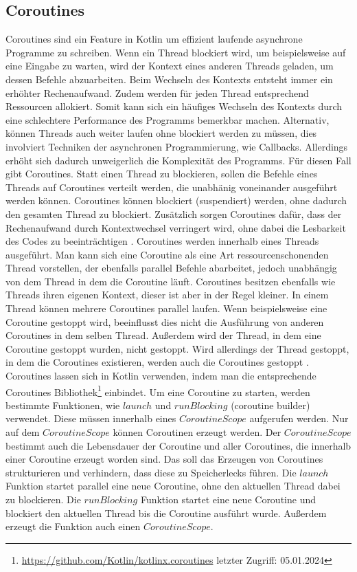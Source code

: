 \documentclass{article}
\begin{document}
\subsection{Coroutines}
Coroutines sind ein Feature in Kotlin um effizient laufende asynchrone Programme zu schreiben. Wenn ein Thread blockiert wird, um beispielsweise auf eine Eingabe zu warten, wird der Kontext eines anderen Threads geladen, um dessen Befehle abzuarbeiten. Beim Wechseln des Kontexts entsteht immer ein erhöhter Rechenaufwand. Zudem werden für jeden Thread entsprechend Ressourcen allokiert. Somit kann sich ein häufiges Wechseln des Kontexts durch eine schlechtere Performance des Programms bemerkbar machen. Alternativ, können Threads auch weiter laufen ohne blockiert werden zu müssen, dies involviert Techniken der asynchronen Programmierung, wie Callbacks. Allerdings erhöht sich dadurch unweigerlich die Komplexität des Programms. Für diesen Fall gibt Coroutines. Statt einen Thread zu blockieren, sollen die Befehle eines Threads auf Coroutines verteilt werden, die unabhänig voneinander ausgeführt werden können. Coroutines können blockiert (suspendiert) werden, ohne dadurch den gesamten Thread zu blockiert. Zusätzlich sorgen Coroutines dafür, dass der Rechenaufwand durch Kontextwechsel verringert wird, ohne dabei die Lesbarkeit des Codes zu beeinträchtigen \cite{Kotlin_In-D}. \newline
Coroutines werden innerhalb eines Threads ausgeführt. Man kann sich eine Coroutine als eine Art ressourcenschonenden Thread vorstellen, der ebenfalls parallel Befehle abarbeitet, jedoch unabhängig von dem Thread in dem die Coroutine läuft. Coroutines besitzen ebenfalls wie Threads ihren eigenen Kontext, dieser ist aber in der Regel kleiner. In einem Thread können mehrere Coroutines parallel laufen. Wenn beispielsweise eine Coroutine gestoppt wird, beeinflusst dies nicht die Ausführung von anderen Coroutines in dem selben Thread. Außerdem  wird der Thread, in dem eine Coroutine gestoppt wurden, nicht gestoppt. Wird allerdings der Thread gestoppt, in dem die Coroutines existieren, werden auch die Coroutines gestoppt \cite{KotlinLangDocCoroutines}. \newline
Coroutines lassen sich in Kotlin verwenden, indem man die entsprechende Coroutines Bibliothek\footnote{\url{https://github.com/Kotlin/kotlinx.coroutines} letzter Zugriff: 05.01.2024} einbindet.  Um eine Coroutine zu starten, werden bestimmte Funktionen, wie $launch$ und $runBlocking$ (coroutine builder) verwendet. Diese müssen innerhalb eines $CoroutineScope$ aufgerufen werden. Nur auf dem $CoroutineScope$ können Coroutinen erzeugt werden. Der $CoroutineScope$ bestimmt auch die Lebensdauer der Coroutine und aller Coroutines, die innerhalb einer Coroutine erzeugt worden sind.  Das soll das Erzeugen von Coroutines strukturieren und verhindern, dass diese zu Speicherlecks führen.  Die $launch$ Funktion startet parallel eine neue Coroutine, ohne den aktuellen Thread dabei zu blockieren. Die $runBlocking$ Funktion startet eine neue Coroutine und blockiert den aktuellen Thread bis die Coroutine ausführt wurde. Außerdem erzeugt die Funktion auch einen $CoroutineScope$.
\end{document}

